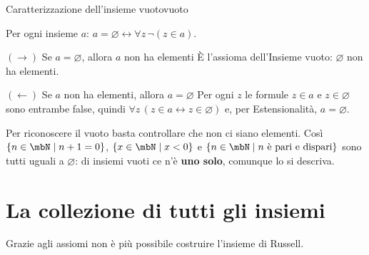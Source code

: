 \begin{concetto}
\begin{Lemma}{Caratterizzazione dell'insieme vuoto}{vuoto}
    \begin{prerequisiti}
    \end{prerequisiti}
    Per ogni insieme $a$: \quad $a = \varnothing \leftrightarrow \forall z\,\neg(z \in a)$.
\end{Lemma}
\begin{dimostrazione}
    \begin{caso}{$(\rightarrow)$ Se $a = \varnothing$, allora $a$ non ha elementi}
        È l'assioma dell'Insieme vuoto: $\varnothing$ non ha elementi.
    \end{caso}
    \begin{caso}{$(\leftarrow)$ Se $a$ non ha elementi, allora $a = \varnothing$}
        Per ogni $z$ le formule $z \in a$ e $z \in \varnothing$ sono entrambe false, quindi
        $\forall z\,(z \in a \leftrightarrow z \in \varnothing)$ e, per Estensionalità, $a = \varnothing$.
    \end{caso}
\end{dimostrazione}
\end{concetto}

\begin{spiegazione}
    Per riconoscere il vuoto basta controllare che non ci siano elementi. Così $\{n \in \mbN \mid n + 1 = 0\}$, $\{x \in \mbN \mid x < 0\}$ e $\{n \in \mbN \mid n \text{ è pari e dispari}\}$
    sono tutti uguali a $\varnothing$: di insiemi vuoti ce n'è \textbf{uno solo}, comunque lo si descriva.
\end{spiegazione}


\section{La collezione di tutti gli insiemi}\label{sec:russell}

Grazie agli assiomi non è più possibile costruire l'insieme di Russell.

